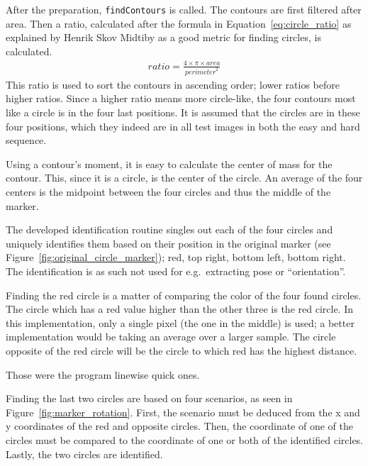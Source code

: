 After the preparation, \verb|findContours| is called.
The contours are first filtered after area.
Then a ratio, calculated after the formula in Equation~\vref{eq:circle_ratio} as explained by Henrik Skov Midtiby as a good metric for finding circles, is calculated.
\begin{align}\label{eq:circle_ratio}
    \mathit{ratio} = \frac{4\times\pi\times\mathit{area}}{\mathit{perimeter}^2}
\end{align}
This ratio is used to sort the contours in ascending order; lower ratios before higher ratios.
Since a higher ratio means more circle-like, the four contours most like a circle is in the four last positions.
It is assumed that the circles are in these four positions, which they indeed are in all test images in both the easy and hard sequence.

Using a contour's moment, it is easy to calculate the center of mass for the contour.
This, since it is a circle, is the center of the circle.
An average of the four centers is the midpoint between the four circles and thus the middle of the marker.

The developed identification routine singles out each of the four circles and uniquely identifies them based on their position in the original marker (see Figure~\vref{fig:original_circle_marker}); red, top right, bottom left, bottom right.
The identification is as such not used for e.g.\ extracting pose or ``orientation''.

Finding the red circle is a matter of comparing the color of the four found circles.
The circle which has a red value higher than the other three is the red circle.
In this implementation, only a single pixel (the one in the middle) is used; a better implementation would be taking an average over a larger sample.
The circle opposite of the red circle will be the circle to which red has the highest distance.

Those were the program linewise quick ones.

Finding the last two circles are based on four scenarios, as seen in Figure~\vref{fig:marker_rotation}.
First, the scenario must be deduced from the x and y coordinates of the red and opposite circles.
Then, the coordinate of one of the circles must be compared to the coordinate of one or both of the identified circles.
Lastly, the two circles are identified.

